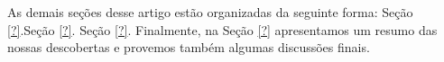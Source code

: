 As demais se\c{c}\~{o}es desse artigo est\~{a}o organizadas da seguinte forma: Se\c{c}\~{a}o \ref{?}.Se\c{c}\~{a}o \ref{?}. Se\c{c}\~{a}o \ref{?}. Finalmente, na Se\c{c}\~{a}o \ref{?} apresentamos um resumo das nossas descobertas e provemos tamb\'{e}m algumas discuss\~{o}es finais. 



